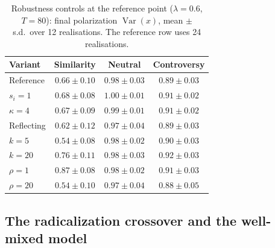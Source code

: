 \documentclass[5p,times,twocolumn]{elsarticle}
\begin{document}
\begin{table}[!t]
  \caption{Robustness controls at the reference point ($\lambda = 0.6$,
  $T = 80$): final polarization $\operatorname{Var}(x)$, mean $\pm$ s.d.\
  over 12 realisations. The reference row uses 24 realisations.}
  \label{tab:controls}
  \begin{tabular}{lccc}
    \toprule
    Variant & Similarity & Neutral & Controversy \\
    \midrule
    Reference & $0.66 \pm 0.10$ & $0.98 \pm 0.03$ & $0.89 \pm 0.03$ \\
    $s_i = 1$ & $0.68 \pm 0.08$ & $1.00 \pm 0.01$ & $0.91 \pm 0.02$ \\
    $\kappa = 4$ & $0.67 \pm 0.09$ & $0.99 \pm 0.01$ & $0.91 \pm 0.02$ \\
    Reflecting & $0.62 \pm 0.12$ & $0.97 \pm 0.04$ & $0.89 \pm 0.03$ \\
    $k = 5$ & $0.54 \pm 0.08$ & $0.98 \pm 0.02$ & $0.90 \pm 0.03$ \\
    $k = 20$ & $0.76 \pm 0.11$ & $0.98 \pm 0.03$ & $0.92 \pm 0.03$ \\
    $\rho = 1$ & $0.87 \pm 0.08$ & $0.98 \pm 0.02$ & $0.91 \pm 0.03$ \\
    $\rho = 20$ & $0.54 \pm 0.10$ & $0.97 \pm 0.04$ & $0.88 \pm 0.05$ \\
    \bottomrule
  \end{tabular}
\end{table}

\subsection{The radicalization crossover and the well-mixed model}
\label{sec:results-threshold}
\end{document}
